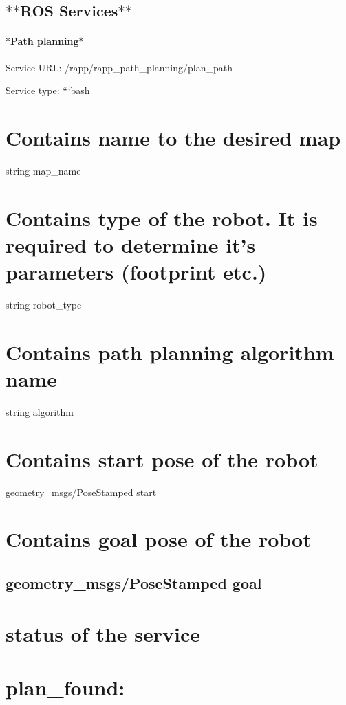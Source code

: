 \subsection*{$\ast$$\ast$\-R\-O\-S Services$\ast$$\ast$ }

\paragraph*{$\ast$\-Path planning$\ast$}

Service U\-R\-L\-: {\ttfamily /rapp/rapp\-\_\-path\-\_\-planning/plan\-\_\-path}

Service type\-: ```bash \section*{Contains name to the desired map}

string map\-\_\-name \section*{Contains type of the robot. It is required to determine it's parameters (footprint etc.)}

string robot\-\_\-type \section*{Contains path planning algorithm name}

string algorithm \section*{Contains start pose of the robot}

geometry\-\_\-msgs/\-Pose\-Stamped start \section*{Contains goal pose of the robot}

\subsection*{geometry\-\_\-msgs/\-Pose\-Stamped goal }

\section*{status of the service}

\section*{plan\-\_\-found\-:}

